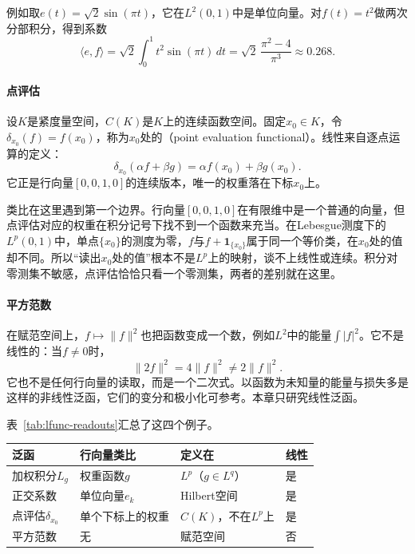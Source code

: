 例如取$e(t)=\sqrt2\sin(\pi t)$，它在$L^2(0,1)$中是单位向量。对$f(t)=t^2$做两次分部积分，得到系数
\[
\langle e,f\rangle=\sqrt2\int_0^1t^2\sin(\pi t)\,dt=\sqrt2\,\frac{\pi^2-4}{\pi^3}\approx0.268 .
\]

\paragraph{点评估}
设$K$是紧度量空间，$C(K)$是$K$上的连续函数空间。固定$x_0\in K$，令$\delta_{x_0}(f)=f(x_0)$，称为$x_0$处的（point evaluation functional）。线性来自逐点运算的定义：
\[
\delta_{x_0}(\alpha f+\beta g)=\alpha f(x_0)+\beta g(x_0).
\]
它正是行向量$[0,0,1,0]$的连续版本，唯一的权重落在下标$x_0$上。

类比在这里遇到第一个边界。行向量$[0,0,1,0]$在有限维中是一个普通的向量，但点评估对应的权重在积分记号下找不到一个函数来充当。在Lebesgue测度下的$L^p(0,1)$中，单点$\{x_0\}$的测度为零，$f$与$f+\mathbf{1}_{\{x_0\}}$属于同一个等价类，在$x_0$处的值却不同。所以“读出$x_0$处的值”根本不是$L^p$上的映射，谈不上线性或连续。积分对零测集不敏感，点评估恰恰只看一个零测集，两者的差别就在这里。

\paragraph{平方范数}
在赋范空间上，$f\mapsto\lVert f\rVert^2$也把函数变成一个数，例如$L^2$中的能量$\int\lvert f\rvert^2$。它不是线性的：当$f\neq0$时，
\[
\lVert2f\rVert^2=4\lVert f\rVert^2\neq2\lVert f\rVert^2 .
\]
它也不是任何行向量的读取，而是一个二次式。以函数为未知量的能量与损失多是这样的非线性泛函，它们的变分和极小化可参考。本章只研究线性泛函。

表~\ref{tab:lfunc-readouts}汇总了这四个例子。

\begin{BookInlineTable}
  \centering
  \begin{tabular}{@{}llll@{}}
    \toprule
    泛函 & 行向量类比 & 定义在 & 线性\\
    \midrule
    加权积分$L_g$ & 权重函数$g$ & $L^p$（$g\in L^q$） & 是\\
    正交系数 & 单位向量$e_k$ & Hilbert空间 & 是\\
    点评估$\delta_{x_0}$ & 单个下标上的权重 & $C(K)$，不在$L^p$上 & 是\\
    平方范数 & 无 & 赋范空间 & 否\\
    \bottomrule
  \end{tabular}
  \caption{四个常见泛函与它们的定义域。}
  \label{tab:lfunc-readouts}
\end{BookInlineTable}


